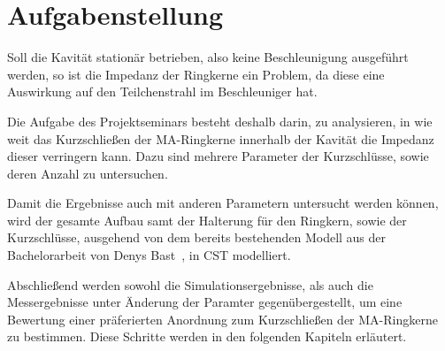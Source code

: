 \section{Aufgabenstellung}
Soll die Kavit\"at station\"ar betrieben, also keine Beschleunigung ausgef\"uhrt werden, so ist die Impedanz der Ringkerne ein Problem, da diese eine Auswirkung auf den Teilchenstrahl im Beschleuniger hat.
\par
Die Aufgabe des Projektseminars besteht deshalb darin, zu analysieren, in wie weit das Kurzschlie\ss{}en der MA-Ringkerne innerhalb der Kavit\"at die Impedanz dieser verringern kann. Dazu sind mehrere Parameter der Kurzschl\"usse, sowie deren Anzahl zu untersuchen.
\par
Damit die Ergebnisse auch mit anderen Parametern untersucht werden k\"onnen, wird der gesamte Aufbau samt der Halterung f\"ur den Ringkern, sowie der Kurzschl\"usse, ausgehend von dem bereits bestehenden Modell aus der Bachelorarbeit von Denys Bast~\citep{bast2017ba}, in CST modelliert. 
\par
Abschlie\ss{}end werden sowohl die Simulationsergebnisse, als auch die Messergebnisse unter \"Anderung der Paramter gegen\"ubergestellt, um eine Bewertung einer pr\"aferierten Anordnung zum Kurzschlie\ss{}en der MA-Ringkerne zu bestimmen. Diese Schritte werden in den folgenden Kapiteln erl\"autert. 